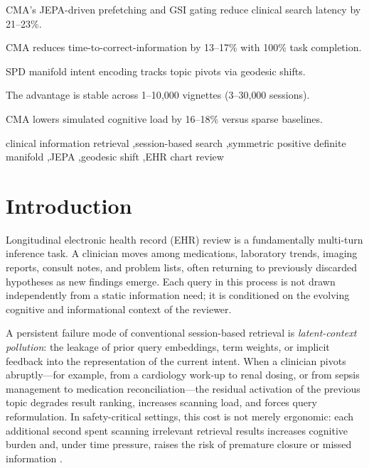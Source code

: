 \documentclass[preprint,12pt]{elsarticle}
\begin{document}
\begin{frontmatter}
\begin{abstract}
\textbf{Conclusion.} CMA's geodesic-shift-aware gating and JEPA-driven prefetching improve time-to-information, cognitive load, and latency in multi-turn clinical search while preserving perfect task completion. The advantage is stable from a single-vignette benchmark to a 10{,}000-vignette scaling study, indicating that the mechanisms---SPD intent encoding, geodesic-shift gating, and predictive prefetching---translate robustly to clinically relevant chart-review workloads.
\end{abstract}

\begin{highlights}
\item CMA's JEPA-driven prefetching and GSI gating reduce clinical search latency by 21--23\%.
\item CMA reduces time-to-correct-information by 13--17\% with 100\% task completion.
\item SPD manifold intent encoding tracks topic pivots via geodesic shifts.
\item The advantage is stable across 1--10{,}000 vignettes (3--30{,}000 sessions).
\item CMA lowers simulated cognitive load by 16--18\% versus sparse baselines.
\end{highlights}

\begin{keyword}
clinical information retrieval \sep session-based search \sep symmetric positive definite manifold \sep JEPA \sep geodesic shift \sep EHR chart review
\end{keyword}

\end{frontmatter}

\section{Introduction}
Longitudinal electronic health record (EHR) review is a fundamentally multi-turn inference task. A clinician moves among medications, laboratory trends, imaging reports, consult notes, and problem lists, often returning to previously discarded hypotheses as new findings emerge. Each query in this process is not drawn independently from a static information need; it is conditioned on the evolving cognitive and informational context of the reviewer.

A persistent failure mode of conventional session-based retrieval is \emph{latent-context pollution}: the leakage of prior query embeddings, term weights, or implicit feedback into the representation of the current intent. When a clinician pivots abruptly---for example, from a cardiology work-up to renal dosing, or from sepsis management to medication reconciliation---the residual activation of the previous topic degrades result ranking, increases scanning load, and forces query reformulation. In safety-critical settings, this cost is not merely ergonomic: each additional second spent scanning irrelevant retrieval results increases cognitive burden and, under time pressure, raises the risk of premature closure or missed information \citep{topol2019}.
\end{document}
